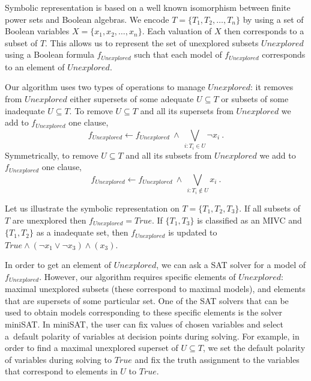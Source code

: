 Symbolic representation is based on a well known isomorphism between finite power sets and Boolean algebras. We encode $T = \{T_1, T_2, \ldots , T_n \}$ by using a set of Boolean variables $X = \{x_1, x_2, \ldots , x_n \}$. Each valuation of $X$ then corresponds to a subset of $T$. This allows us to represent the set of unexplored subsets $\mathit{Unexplored}$ using a Boolean formula $f_{\mathit{Unexplored}}$ such that each model of $f_{\mathit{Unexplored}}$ corresponds to an element of $\mathit{Unexplored}$.

Our algorithm uses two types of operations to manage $\mathit{Unexplored}$: it removes from $\mathit{Unexplored}$ either supersets of some adequate $U \subseteq T$ or subsets of some inadequate $U \subseteq T$. To remove $U \subseteq T$ and all its supersets from $\mathit{Unexplored}$ we add to $f_{\mathit{Unexplored}}$ one clause,
		$$f_{\mathit{Unexplored}} \gets f_{\mathit{Unexplored}} \ \wedge  \ \bigvee\limits_{i: T_i \in U} \neg x_i\ .$$
Symmetrically, to remove $U \subseteq T$ and all its subsets from $\mathit{Unexplored}$ we add to $f_{\mathit{Unexplored}}$  one clause,
		$$f_{\mathit{Unexplored}} \gets f_{\mathit{Unexplored}} \ \wedge \  \bigvee\limits_{i: T_i \not\in U} x_i\ .$$


\begin{example}\label{ex:unex}
Let us illustrate the symbolic representation on $T = \{ T_1, T_2, T_3 \}$. If  all subsets of $T$ are unexplored then $f_{\mathit{Unexplored}} = \mathit{True}$. If   $\{T_1, T_3 \}$ is classified as an MIVC and $\{T_1, T_2 \}$ as a inadequate set, then $f_{\mathit{Unexplored}}$ is updated to $\mathit{True} \wedge (\neg x_1 \vee \neg x_3) \wedge (x_3)$.
\end{example}


In order to get an element of $\mathit{Unexplored}$, we can ask a SAT solver for a model of $f_{\mathit{Unexplored}}$. However, our algorithm requires specific elements of $\mathit{Unexplored}$: maximal unexplored subsets (these correspond to maximal models), and elements that are supersets of some particular set.  One of the SAT solvers that can be used to obtain models corresponding to these specific elements is the solver miniSAT\cite{minisat}. In miniSAT,  the user can fix values of chosen variables and select a~default polarity of variables at decision points during solving.
For example, in order to find a maximal unexplored superset of $U \subseteq T$, we set the default polarity of variables during solving to $\mathit{True}$ and fix the truth assignment to the variables that correspond to elements in $U$ to $\mathit{True}$.

